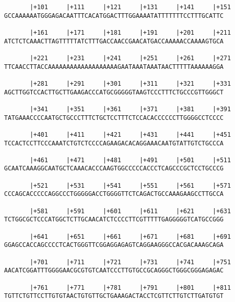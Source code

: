 \documentclass{article}
\begin{document}
\begin{Verbatim}
       |+101     |+111     |+121     |+131     |+141     |+151
GCCAAAAAATGGGAGACAATTTCACATGGACTTTGGAAAATATTTTTTTCCTTTGCATTC
                                                            
       |+161     |+171     |+181     |+191     |+201     |+211
ATCTCTCAAACTTAGTTTTTATCTTTGACCAACCGAACATGACCAAAAACCAAAAGTGCA
                                                            
       |+221     |+231     |+241     |+251     |+261     |+271
TTCAACCTTACCAAAAAAAAAAAAAAAAAAAGAATAAATAAATAACTTTTTAAAAAAGGA
                                                            
       |+281     |+291     |+301     |+311     |+321     |+331
AGCTTGGTCCACTTGCTTGAAGACCCATGCGGGGGTAAGTCCCTTTCTGCCCGTTGGGCT
                                                            
       |+341     |+351     |+361     |+371     |+381     |+391
TATGAAACCCCAATGCTGCCCTTTCTGCTCCTTTCTCCACACCCCCCTTGGGGCCTCCCC
                                                            
       |+401     |+411     |+421     |+431     |+441     |+451
TCCACTCCTTCCCAAATCTGTCTCCCCAGAAGACACAGGAAACAATGTATTGTCTGCCCA
                                                            
       |+461     |+471     |+481     |+491     |+501     |+511
GCAATCAAAGGCAATGCTCAAACACCCAAGTGGCCCCCACCCTCAGCCCGCTCCTGCCCG
                                                            
       |+521     |+531     |+541     |+551     |+561     |+571
CCCAGCACCCCCAGGCCCTGGGGGACCTGGGGTTCTCAGACTGCCAAAGAAGCCTTGCCA
                                                            
       |+581     |+591     |+601     |+611     |+621     |+631
TCTGGCGCTCCCATGGCTCTTGCAACATCTCCCCTTCGTTTTTGAGGGGGTCATGCCGGG
                                                            
       |+641     |+651     |+661     |+671     |+681     |+691
GGAGCCACCAGCCCCTCACTGGGTTCGGAGGAGAGTCAGGAAGGGCCACGACAAAGCAGA
                                                            
       |+701     |+711     |+721     |+731     |+741     |+751
AACATCGGATTTGGGGAACGCGTGTCAATCCCTTGTGCCGCAGGGCTGGGCGGGAGAGAC
                                                            
       |+761     |+771     |+781     |+791     |+801     |+811
TGTTCTGTTCCTTGTGTAACTGTGTTGCTGAAAGACTACCTCGTTCTTGTCTTGATGTGT
                                                            

\end{Verbatim}
\end{document}
